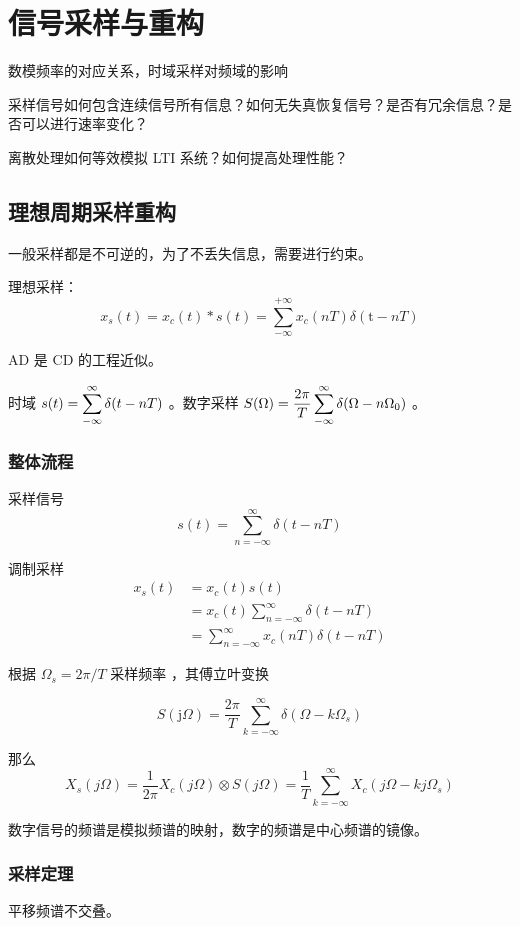 \documentclass[cn,11pt,chinese,black,simple]{../elegantbook}
\begin{document}
\fi 
\def\chapname{03sampandrebuild}

\chapter{信号采样与重构}

\begin{introduction}
    \item 数模频率的对应关系，时域采样对频域的影响
    \item 采样信号如何包含连续信号所有信息？如何无失真恢复信号？是否有冗余信息？是否可以进行速率变化？
    \item 离散处理如何等效模拟 LTI 系统？如何提高处理性能？
\end{introduction}

\section{理想周期采样重构}

一般采样都是不可逆的，为了不丢失信息，需要进行约束。

理想采样： \[x_{s}(t)=x_{c}(t) * s(t)=\sum_{-\infty}^{+\infty} x_{c}(n T) \delta(\mathrm{t}-n T)\]

AD 是 CD 的工程近似。

时域 \(s(t) = \displaystyle\sum_{-\infty}^\infty \delta(t-nT)\) 。数字采样 \(S(\Omega) = \dfrac{2 \pi}{T} \displaystyle\sum_{-\infty}^\infty \delta(\Omega - n \Omega_0)\) 。

\subsection{整体流程}

采样信号 \[s(t)=\sum_{n=-\infty}^{\infty} \delta(t-n T)\]

调制采样 \[\begin{aligned}
    x_{s}(t) &=x_{c}(t) s(t) \\
    &=x_{c}(t) \sum_{n=-\infty}^{\infty} \delta(t-n T) \\
    &= \sum_{n=-\infty}^{\infty} x_c(nT) \delta(t-n T) 
    \end{aligned}\]

根据 \(\Omega_s = 2\pi / T\) 采样频率 ，其傅立叶变换

\[S(\mathrm{j} \Omega)=\frac{2 \pi}{T} \sum_{k=-\infty}^{\infty} \delta\left(\Omega-k \Omega_{s}\right)\]

那么 \[X_s(j\Omega) = \frac{1}{2\pi} X_c(j\Omega) \otimes S(j\Omega) = \frac{1}{T} \sum_{k=-\infty}^\infty X_c(j\Omega - kj\Omega_s)\] 

数字信号的频谱是模拟频谱的映射，数字的频谱是中心频谱的镜像。

\subsection{采样定理}

平移频谱不交叠。



\let\chapname\undefined
\ifx\mainclass\undefined
\end{document}
